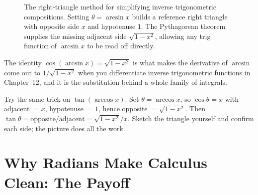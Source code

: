 \begin{figure}[htbp]
\centering
{}
\caption{The right-triangle method for simplifying inverse trigonometric compositions. Setting $\theta = \arcsin x$ builds a reference right triangle with opposite side $x$ and hypotenuse $1$. The Pythagorean theorem supplies the missing adjacent side $\sqrt{1-x^2}$, allowing any trig function of $\arcsin x$ to be read off directly.}
\label{ch04:fig-triangle-trick}
\end{figure}

The identity $\cos(\arcsin x) = \sqrt{1-x^2}$ is what makes the derivative of $\arcsin$ come out to $1/\sqrt{1-x^2}$ when you differentiate inverse trigonometric functions in Chapter~12, and it is the substitution behind a whole family of integrals.

\begin{labbox}
Try the same trick on $\tan(\arccos x)$. Set $\theta=\arccos x$, so $\cos\theta = x$ with adjacent $=x$, hypotenuse $=1$, hence opposite $=\sqrt{1-x^2}$. Then $\tan\theta = \text{opposite}/\text{adjacent} = \sqrt{1-x^2}/x$. Sketch the triangle yourself and confirm each side; the picture does all the work.
\end{labbox}

\section{Why Radians Make Calculus Clean: The Payoff}
\label{ch04:why-radians}

